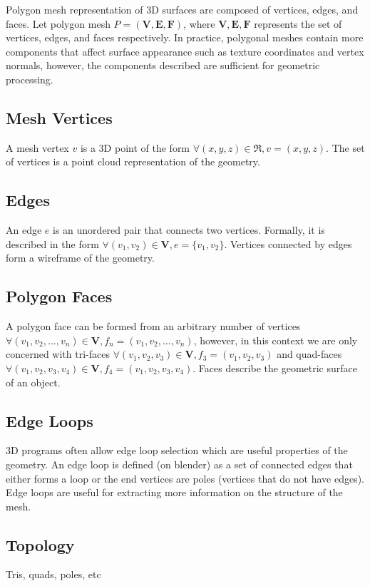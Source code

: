 \documentclass[ %
                    author={Dillon Keith Diep [INCOMPLETE DRAFT, NOT FOR SUBMISSION]},
                supervisor={Dr. Carl Henrik Ek},
                    degree={MEng},
                     title={ARt-CG:},
                  subtitle={Assisted Real-time Content Generation of 3D Hair by Learning Manifolds},
                      type={Research},
                      year={2014} ]{dissertation}
\begin{document}
Polygon mesh representation of 3D surfaces are composed of vertices, edges, and faces. Let polygon mesh $P = (\mathbf{V, E, F})$, where $\mathbf{V, E, F}$ represents the set of vertices, edges, and faces respectively. In practice, polygonal meshes contain more components that affect surface appearance such as texture coordinates and vertex normals, however, the components described are sufficient for geometric processing.

\subsection{Mesh Vertices}
A mesh vertex $v$ is a 3D point of the form $\forall (x, y, z) \in \Re, v = (x, y, z)$.
The set of vertices is a point cloud representation of the geometry. 

\subsection{Edges}
An edge $e$ is an unordered pair that connects two vertices. Formally, it is described in the form $\forall (v_1, v_2) \in \mathbf{V}, e = \{v_1, v_2\}$. Vertices connected by edges form a wireframe of the geometry. 

\subsection{Polygon Faces}
A polygon face can be formed from an arbitrary number of vertices $\forall (v_1, v_2,...,v_n) \in \mathbf{V}, f_n = (v_1, v_2,..., v_n)$, however, in this context we are only concerned with tri-faces $\forall (v_1, v_2, v_3) \in \mathbf{V}, f_3 = (v_1, v_2, v_3)$ and quad-faces $\forall (v_1, v_2, v_3, v_4) \in \mathbf{V}, f_4 = (v_1, v_2, v_3, v_4)$. Faces describe the geometric surface of an object. 

\subsection{Edge Loops}
{\color{red}
3D programs often allow edge loop selection which are useful properties of the geometry. An edge loop is defined (on blender) as a set of connected edges that either forms a loop or the end vertices are poles (vertices that do not have edges). Edge loops are useful for extracting more information on the structure of the mesh.
\cite{edgeloops}
}

\subsection{Topology}
Tris, quads, poles, etc
\end{document}
